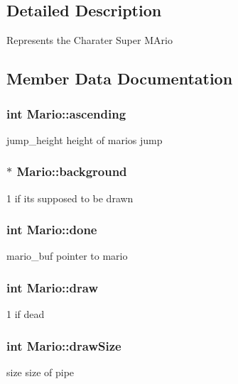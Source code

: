 \subsection{Detailed Description}
Represents the Charater Super M\+Ario 

\subsection{Member Data Documentation}
\subsubsection[{\texorpdfstring{ascending}{ascending}}]{\setlength{\rightskip}{0pt plus 5cm}int Mario\+::ascending}\hypertarget{structMario_aa915b2e693536ff0d976983a33c51675}{}\label{structMario_aa915b2e693536ff0d976983a33c51675}
jump\+\_\+height height of mario\textquotesingle{}s jump 
\subsubsection[{\texorpdfstring{background}{background}}]{$\ast$ Mario\+::background}\hypertarget{structMario_a6e36b388e2610cb9af195f05a5e0d93a}{}\label{structMario_a6e36b388e2610cb9af195f05a5e0d93a}
1 if its supposed to be drawn 
\subsubsection[{\texorpdfstring{done}{done}}]{\setlength{\rightskip}{0pt plus 5cm}int Mario\+::done}\hypertarget{structMario_ac356a194a42781bd6860663fda999834}{}\label{structMario_ac356a194a42781bd6860663fda999834}
mario\+\_\+buf pointer to mario 
\subsubsection[{\texorpdfstring{draw}{draw}}]{\setlength{\rightskip}{0pt plus 5cm}int Mario\+::draw}\hypertarget{structMario_a9c9f2d2e801d1680b64dfa627c713042}{}\label{structMario_a9c9f2d2e801d1680b64dfa627c713042}
1 if dead 
\subsubsection[{\texorpdfstring{draw\+Size}{drawSize}}]{\setlength{\rightskip}{0pt plus 5cm}int Mario\+::draw\+Size}\hypertarget{structMario_a25bf8be536577d81da72c7272090ade7}{}\label{structMario_a25bf8be536577d81da72c7272090ade7}
size size of pipe 
